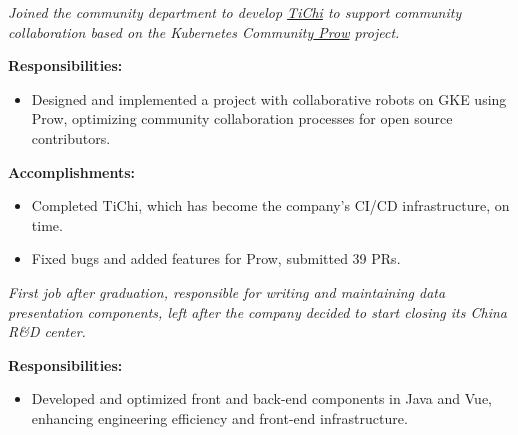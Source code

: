 \documentclass{software_engineer_poe_liu}
\newcommand{\en}[1]{#1}
\newcommand{\zh}[1]{}
\begin{document}
\en{}
\zh{\datedsubsection{\textbf{\href{https://pingcap.com/zh/}{PingCAP Inc. - 数据库 - 前后端开发工程师（Golang/JS）}}}{2020/08 -- 2021/07}}
\en{\textsl{Joined the community department to develop {\href{https://github.com/ti-community-infra/tichi}{TiChi}} to support community collaboration based on the Kubernetes Community{\href{https://github.com/kubernetes/test-infra/tree/master/prow}{ Prow}} project.}}
\zh{\textsl{加入了社区部门，以 Kubernetes 社区{\href{https://github.com/kubernetes/test-infra/tree/master/prow}{ Prow}} 项目为基础开发{\href{https://github.com/ti-community-infra/tichi}{ TiChi}} 来支撑社区协作。}}

\en{\textbf{Responsibilities:}}
\zh{\textbf{职责：}}
\begin{itemize}
      \item \en{Designed and implemented a project with collaborative robots on GKE using Prow, optimizing community collaboration processes for open source contributors.}
            \zh{使用 Prow 在 GKE 上设计和实现一个协作机器人项目，优化开源贡献者的社区协作流程。}
\end{itemize}

\en{\textbf{Accomplishments:}}
\zh{\textbf{产出：}}
\begin{itemize}
      \item \en{Completed TiChi, which has become the company's CI/CD infrastructure, on time.}
            \zh{按时完成了项目的设计和开发，TiChi 已经成为了公司 CI/CD 的基础设施。}
      \item \en{Fixed bugs and added features for Prow, submitted 39 PRs.}
            \zh{为 Prow 修复 bug 和添加功能，提交了 39 个 PR。}
\end{itemize}

\en{}
\zh{\datedsubsection{\textbf{\href{https://www.morningstar.com/}{晨星资讯（Morningstar, Inc.）- 金融服务 - 前后端开发工程师（Java/JS）}}}{2019/06 -- 2020/07}}
\en{\textsl{First job after graduation, responsible for writing and maintaining data presentation components, left after the company decided to start closing its China R\&D center.}}
\zh{\textsl{毕业后第一份工作，负责编写和维护数据展示组件，在公司决定开始关闭中国研发中心后离职。}}

\en{\textbf{Responsibilities:}}
\zh{\textbf{职责：}}
\begin{itemize}
      \item \en{Developed and optimized front and back-end components in Java and Vue, enhancing engineering efficiency and front-end infrastructure.}
            \zh{使用 Java 和 Vue 开发和优化前后端组件，提升工程效率和前端基础设施。}
\end{itemize}
\end{document}

